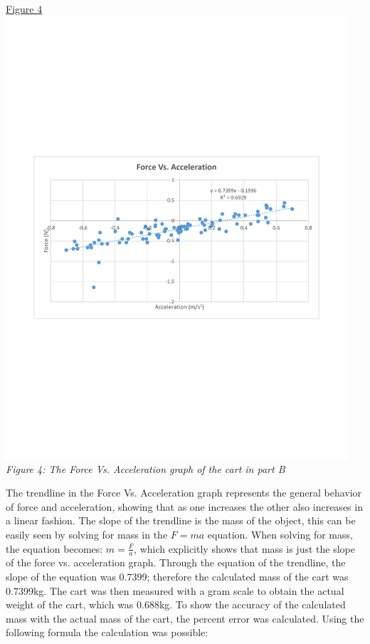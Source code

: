 \documentclass[aps,letterpaper,11pt]{revtex4}
\begin{document}
\begin{center}
\underline{Figure 4}\\
\vspace{-50mm}
\includegraphics[width=5in]{FinalDataAccelerationForceGraph.pdf}\\
\vspace{-50mm}
\textit{Figure 4: The Force Vs. Acceleration graph of the cart in part B}
\end{center}

The trendline in the Force Vs. Acceleration graph represents the general behavior of force and acceleration, showing that as one increases the other also increases in a linear fashion. The slope of the trendline is the mass of the object, this can be easily seen by solving for mass in the $F = ma$ equation. When solving for mass, the equation becomes: $m=\frac{F}{a}$, which explicitly shows that mass is just the slope of the force vs. acceleration graph. Through the equation of the trendline, the slope of the equation was 0.7399; therefore the calculated mass of the cart was 0.7399kg. The cart was then measured with a gram scale to obtain the actual weight of the cart, which was 0.688kg. To show the accuracy of the calculated mass with the actual mass of the cart, the percent error was calculated. Using the following formula the calculation was possible:
\end{document}
